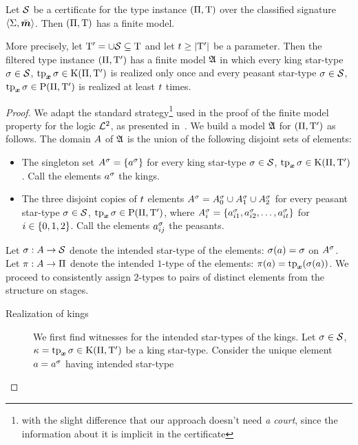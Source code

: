 \begin{lemma}\label{lem:cert-expand}
Let $\mathcal{S}$ be a certificate for the type instance $(\Pi,\mathrm{T})$ over the
classified signature $\left\langle \mathrm{\Sigma},\bar{\bm{m}} \right\rangle$.
Then $(\Pi,\mathrm{T})$ has a finite model.

More precisely, let ${\mathrm{T}'} = \cup\mathcal{S} \subseteq \mathrm{T}$
and let $t \geq \left|{\mathrm{T}'}\right|$ be a parameter.
Then the filtered type instance $(\Pi,{\mathrm{T}'})$ has a finite model $\mathfrak{A}$ in
which every king star-type $\sigma\in\mathcal{S}$, $\operatorname{tp}_{\bm{x}}\sigma \in \mathrm{K}(\Pi,{\mathrm{T}'})$ is realized only once and every peasant star-type
$\sigma\in\mathcal{S}$, $\operatorname{tp}_{\bm{x}}\sigma \in \mathrm{P}(\Pi,{\mathrm{T}'})$ is realized at least $t$
times.
\end{lemma}
\begin{proof}
We adapt the standard strategy\footnote{with the slight difference that our
approach doesn't need \emph{a court}, since the information about it is implicit
in the certificate} used in the proof of the finite model property for the logic
$\mathcal{L}^{2}$, as presented in~\cite{gradel1999logics}.
We build a model $\mathfrak{A}$ for $(\Pi,{\mathrm{T}'})$ as follows.
The domain $A$ of $\mathfrak{A}$ is the union of the following disjoint sets of
elements:
\begin{itemize}
  \item The singleton set $A^{\sigma} = \left\{a^{\sigma}\right\}$ for every king
  star-type $\sigma\in\mathcal{S}$, $\operatorname{tp}_{\bm{x}}\sigma \in \mathrm{K}(\Pi,{\mathrm{T}'})$.
  Call the elements $a^{\sigma}$ the kings.
  \item The three disjoint copies of $t$ elements
  $A^{\sigma} = A^{\sigma}_{0} \cup A^{\sigma}_{1} \cup A^{\sigma}_{2}$ for every
  peasant star-type $\sigma \in \mathcal{S}$, $\operatorname{tp}_{\bm{x}}\sigma \in \mathrm{P}(\Pi,{\mathrm{T}'})$, where
  $A^{\sigma}_{i} = \left\{a^{\sigma}_{i 1}, a^{\sigma}_{i 2}, \dots, a^{\sigma}_{i t}\right\}$
  for $i \in \left\{0,1,2\right\}$.
  Call the elements $a^{\sigma}_{i j}$ the peasants.
\end{itemize}
Let $\sigma : A \to \mathcal{S}$ denote the intended star-type of the elements:
$\sigma(a) = \sigma$ on $A^{\sigma}$.
Let $\pi : A \to \Pi$ denote the intended $1$-type of the elements:
$\pi(a) = \operatorname{tp}_{\bm{x}}(\sigma(a))$.
We proceed to consistently assign $2$-types to pairs of distinct elements from
the structure on stages.
\begin{description}
  \item[Realization of kings] We first find witnesses for the intended
  star-types of the kings.
  Let $\sigma \in \mathcal{S}$, $\kappa = \operatorname{tp}_{\bm{x}}\sigma \in \mathrm{K}(\Pi,{\mathrm{T}'})$
  be a king star-type.
  Consider the unique element $a = a^\sigma$ having intended star-type

\end{description}
\end{proof}
